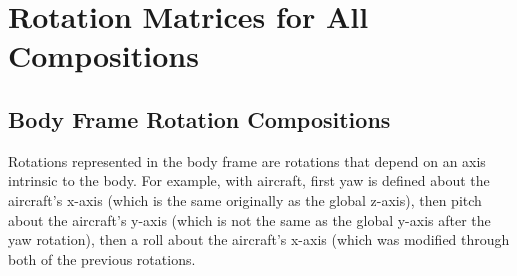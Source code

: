 \documentclass[letterpaper,10pt]{article}
\newcommand\leftidx[3]{%
  {\vphantom{#2}}#1#2#3%
}
\begin{document}

\clearpage
\appendix
\section{Rotation Matrices for All Compositions}
\label{sec:RotMatComp}

\subsection{Body Frame Rotation Compositions}
Rotations represented in the body frame are rotations that depend on an axis intrinsic to the body. For example, with aircraft, first yaw is defined about the aircraft's x-axis (which is the same originally as the global z-axis), then pitch about the aircraft's y-axis (which is not the same as the global y-axis after the yaw rotation), then a roll about the aircraft's x-axis (which was modified through both of the previous rotations.
\end{document}
